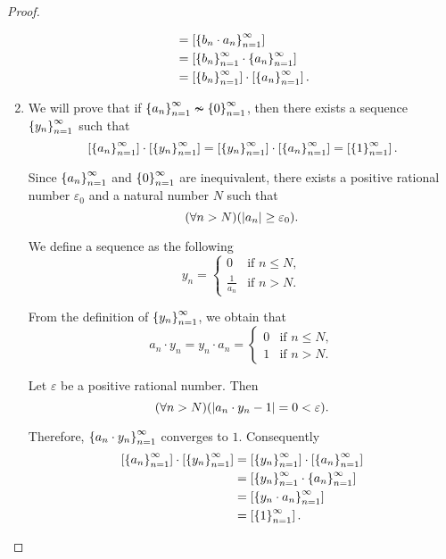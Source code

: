 \begin{proof}
\begin{enumerate}[label={(F\arabic*)},itemsep=0pt,topsep=0pt,start=5]
\begin{align*}
                                                              & = \left[{{\left\{{b_{n}\cdot a_{n}}\right\}}^{\infty}_{n=1}}\right]               \\
                                                              & = \left[{{\left\{{b_{n}}\right\}}^{\infty}_{n=1}\cdot{\left\{{a_{n}}\right\}}^{\infty}_{n=1}}\right]          \\
                                                              & = \left[{{\left\{{b_{n}}\right\}}^{\infty}_{n=1}}\right]\cdot\left[{{\left\{{a_{n}}\right\}}^{\infty}_{n=1}}\right].
              \end{align*}
        \item We will prove that if ${\left\{{a_{n}}\right\}}^{\infty}_{n=1}\nsim{\left\{{0}\right\}}^{\infty}_{n=1}$, then there exists a sequence ${\left\{{y_{n}}\right\}}^{\infty}_{n=1}$ such that
              \[
                  \left[{{\left\{{a_{n}}\right\}}^{\infty}_{n=1}}\right]\cdot\left[{{\left\{{y_{n}}\right\}}^{\infty}_{n=1}}\right] = \left[{{\left\{{y_{n}}\right\}}^{\infty}_{n=1}}\right]\cdot\left[{{\left\{{a_{n}}\right\}}^{\infty}_{n=1}}\right] = \left[{{\left\{{1}\right\}}^{\infty}_{n=1}}\right].
              \]

              Since ${\left\{{a_{n}}\right\}}^{\infty}_{n=1}$ and ${\left\{{0}\right\}}^{\infty}_{n=1}$ are inequivalent, there exists a positive rational number $\varepsilon_{0}$ and a natural number $N$ such that
              \[
                  (\forall n > N)(\left\vert{a_{n}}\right\vert\ge\varepsilon_{0}).
              \]

              We define a sequence as the following
              \[
                  y_{n} = \begin{cases}
                      0               & \text{if $n\le N$}, \\
                      \frac{1}{a_{n}} & \text{if $n > N$}.
                  \end{cases}
              \]

              From the definition of ${\left\{{y_{n}}\right\}}^{\infty}_{n=1}$, we obtain that
              \[
                  a_{n}\cdot y_{n} = y_{n}\cdot a_{n} = \begin{cases}
                      0 & \text{if $n\le N$}, \\
                      1 & \text{if $n > N$}.
                  \end{cases}
              \]

              Let $\varepsilon$ be a positive rational number. Then
              \[
                  (\forall n > N)(\left\vert{a_{n}\cdot y_{n} - 1}\right\vert = 0 < \varepsilon).
              \]

              Therefore, ${\left\{{a_{n}\cdot y_{n}}\right\}}^{\infty}_{n=1}$ converges to $1$. Consequently
              \begin{align*}
                  \left[{{\left\{{a_{n}}\right\}}^{\infty}_{n=1}}\right]\cdot\left[{{\left\{{y_{n}}\right\}}^{\infty}_{n=1}}\right] & = \left[{{\left\{{y_{n}}\right\}}^{\infty}_{n=1}}\right]\cdot\left[{{\left\{{a_{n}}\right\}}^{\infty}_{n=1}}\right] \\
                                                              & = \left[{{\left\{{y_{n}}\right\}}^{\infty}_{n=1}\cdot{\left\{{a_{n}}\right\}}^{\infty}_{n=1}}\right]         \\
                                                              & = \left[{{\left\{{y_{n}\cdot a_{n}}\right\}}^{\infty}_{n=1}}\right]              \\
                                                              & = \left[{{\left\{{1}\right\}}^{\infty}_{n=1}}\right].\qedhere
              \end{align*}
    \end{enumerate}
\end{proof}

